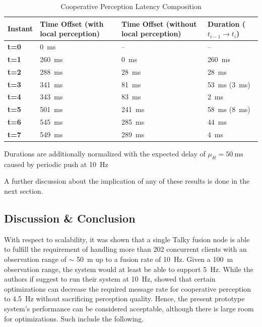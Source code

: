 \begin{table}
	\centering
	\begin{tabular}{|p{1.5cm}|p{4.1cm}|p{4.1cm}|p{4.1cm}|}
		\hline 
		\textbf{Instant} & \textbf{Time Offset} (with local perception) & \textbf{Time Offset} (without local perception) & \textbf{Duration} ($t_{i-1} \rightarrow t_i$) \\ 
		\hline 
		\textbf{t=0} & \SI{0}{\milli\second} & – & – \\ 
		\hline 
		\textbf{t=1} & \SI{260}{\milli\second} & \SI{0}{\milli\second} & \SI{260}{\milli\second} \\ 
		\hline 
		\textbf{t=2} & \SI{288}{\milli\second} & \SI{28}{\milli\second} & \SI{28}{\milli\second} \\ 
		\hline 
		\textbf{t=3} & \SI{341}{\milli\second} & \SI{81}{\milli\second} & \SI{53}{\milli\second} (\SI{3}{\milli\second}) \\ 
		\hline 
		\textbf{t=4} & \SI{343}{\milli\second} & \SI{83}{\milli\second} & \SI{2}{\milli\second} \\ 
		\hline 
		\textbf{t=5} & \SI{501}{\milli\second} & \SI{241}{\milli\second} & \SI{58}{\milli\second} (\SI{8}{\milli\second}) \\ 
		\hline 
		\textbf{t=6} & \SI{545}{\milli\second} & \SI{285}{\milli\second} & \SI{44}{\milli\second} \\ 
		\hline 
		\textbf{t=7} & \SI{549}{\milli\second} & \SI{289}{\milli\second} & \SI{4}{\milli\second} \\ 
		\hline 
	\end{tabular}
	\caption{Cooperative Perception Latency Composition}
	\label{tab:performance_evaluation:latency_composition}
	\medskip
	\small
	Durations are additionally normalized with the expected delay of $\mu_{\delta t} = \SI{50}{\milli\second}$ caused by periodic push at \SI{10}{\hertz}
\end{table}
\par
\bigskip

A further discussion about the implication of any of these results is done in the next section. 

\subsection{Discussion \& Conclusion}
\label{subsec:evaluation:performance_evaluation:discussion_conclusion}
With respect to scalability, it was shown that a single Talky fusion node is able to fulfill the requirement of handling more than 202 concurrent clients with an observation range of $\sim$ \SI{50}{\meter} up to a fusion rate of \SI{10}{\hertz}. Given a \SI{100}{\meter} observation range, the system would at least be able to support \SI{5}{\hertz}. While the authors if \cite{Calvo2017} suggest to run their system at \SI{10}{\hertz}, \cite{Thandavarayan2019} showed that certain optimizations can decrease the required message rate for cooperative perception to \SI{4.5}{\hertz} without sacrificing perception quality. Hence, the present prototype system's performance can be considered acceptable, although there is large room for optimizations. Such include the following.

